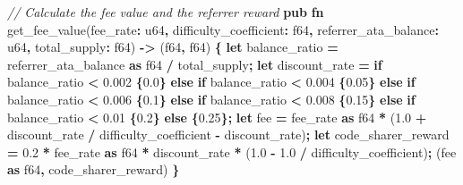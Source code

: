 \documentclass[
]{article}
\newenvironment{Shaded}{\begin{snugshade}}{\end{snugshade}}
\newcommand{\CommentTok}[1]{\textcolor[rgb]{0.56,0.35,0.01}{\textit{#1}}}
\newcommand{\ControlFlowTok}[1]{\textcolor[rgb]{0.13,0.29,0.53}{\textbf{#1}}}
\newcommand{\DataTypeTok}[1]{\textcolor[rgb]{0.13,0.29,0.53}{#1}}
\newcommand{\DecValTok}[1]{\textcolor[rgb]{0.00,0.00,0.81}{#1}}
\newcommand{\KeywordTok}[1]{\textcolor[rgb]{0.13,0.29,0.53}{\textbf{#1}}}
\newcommand{\NormalTok}[1]{#1}
\newcommand{\OperatorTok}[1]{\textcolor[rgb]{0.81,0.36,0.00}{\textbf{#1}}}
\begin{document}
\begin{Shaded}
\begin{Highlighting}[numbers=left,,]
\CommentTok{// Calculate the fee value and the referrer reward}
\KeywordTok{pub} \KeywordTok{fn}\NormalTok{ get\_fee\_value(fee\_rate}\OperatorTok{:} \DataTypeTok{u64}\OperatorTok{,}\NormalTok{ difficulty\_coefficient}\OperatorTok{:} \DataTypeTok{f64}\OperatorTok{,}\NormalTok{ referrer\_ata\_balance}\OperatorTok{:} 
  \DataTypeTok{u64}\OperatorTok{,}\NormalTok{ total\_supply}\OperatorTok{:} \DataTypeTok{f64}\NormalTok{) }\OperatorTok{{-}\textgreater{}}\NormalTok{ (}\DataTypeTok{f64}\OperatorTok{,} \DataTypeTok{f64}\NormalTok{) }\OperatorTok{\{}
  \KeywordTok{let}\NormalTok{ balance\_ratio }\OperatorTok{=}\NormalTok{ referrer\_ata\_balance }\KeywordTok{as} \DataTypeTok{f64} \OperatorTok{/}\NormalTok{ total\_supply}\OperatorTok{;}
  \KeywordTok{let}\NormalTok{ discount\_rate }\OperatorTok{=} \ControlFlowTok{if}\NormalTok{ balance\_ratio }\OperatorTok{\textless{}} \DecValTok{0.002} \OperatorTok{\{}\DecValTok{0.0}\OperatorTok{\}}
  \ControlFlowTok{else} \ControlFlowTok{if}\NormalTok{ balance\_ratio }\OperatorTok{\textless{}} \DecValTok{0.004} \OperatorTok{\{}\DecValTok{0.05}\OperatorTok{\}}
  \ControlFlowTok{else} \ControlFlowTok{if}\NormalTok{ balance\_ratio }\OperatorTok{\textless{}} \DecValTok{0.006} \OperatorTok{\{}\DecValTok{0.1}\OperatorTok{\}}
  \ControlFlowTok{else} \ControlFlowTok{if}\NormalTok{ balance\_ratio }\OperatorTok{\textless{}} \DecValTok{0.008} \OperatorTok{\{}\DecValTok{0.15}\OperatorTok{\}}
  \ControlFlowTok{else} \ControlFlowTok{if}\NormalTok{ balance\_ratio }\OperatorTok{\textless{}} \DecValTok{0.01} \OperatorTok{\{}\DecValTok{0.2}\OperatorTok{\}}
  \ControlFlowTok{else} \OperatorTok{\{}\DecValTok{0.25}\OperatorTok{\};}
  \KeywordTok{let}\NormalTok{ fee }\OperatorTok{=}\NormalTok{ fee\_rate }\KeywordTok{as} \DataTypeTok{f64} \OperatorTok{*}\NormalTok{ (}\DecValTok{1.0} \OperatorTok{+}\NormalTok{ discount\_rate }\OperatorTok{/}\NormalTok{ difficulty\_coefficient }\OperatorTok{{-}} 
\NormalTok{    discount\_rate)}\OperatorTok{;}
  \KeywordTok{let}\NormalTok{ code\_sharer\_reward }\OperatorTok{=} \DecValTok{0.2} \OperatorTok{*}\NormalTok{ fee\_rate }\KeywordTok{as} \DataTypeTok{f64} \OperatorTok{*}\NormalTok{ discount\_rate }\OperatorTok{*}\NormalTok{ (}\DecValTok{1.0} \OperatorTok{{-}} \DecValTok{1.0} \OperatorTok{/} 
\NormalTok{    difficulty\_coefficient)}\OperatorTok{;}
\NormalTok{  (fee }\KeywordTok{as} \DataTypeTok{f64}\OperatorTok{,}\NormalTok{ code\_sharer\_reward)}
\OperatorTok{\}}
\end{Highlighting}
\end{Shaded}
\end{document}
